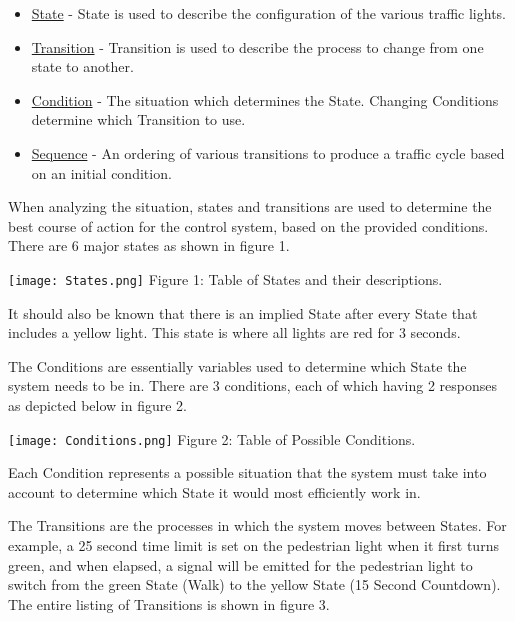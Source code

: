 \documentclass{article}
\begin{document}
\begin{itemize}

\item \underline{State} - State is used to describe the configuration of the various traffic lights.
\item \underline{Transition} - Transition is used to describe the process to change from one state to another.
\item \underline{Condition} - The situation which determines the State. Changing Conditions determine which Transition to use.
\item \underline{Sequence} - An ordering of various transitions to produce a traffic cycle based on an initial condition.

\end{itemize}

When analyzing the situation, states and transitions are used to determine the best course of action for the control system, based on the provided conditions. There are 6 major states as shown in figure 1.

\begin{center}
\texttt{[image: States.png]}
\scriptsize{
Figure 1: Table of States and their descriptions.
}
\end{center}

It should also be known that there is an implied State after every State that includes a yellow light. This state is where all lights are red for 3 seconds.

The Conditions are essentially variables used to determine which State the system needs to be in. There are 3 conditions, each of which having 2 responses as depicted below in figure 2.

\begin{center}
\texttt{[image: Conditions.png]}
\scriptsize{
Figure 2: Table of Possible Conditions.
}
\end{center}

Each Condition represents a possible situation that the system must take into account to determine which State it would most efficiently work in.

The Transitions are the processes in which the system moves between States. For example, a 25 second time limit is set on the pedestrian light when it first turns green, and when elapsed, a signal will be emitted for the pedestrian light to switch from the green State (Walk) to the yellow State (15 Second Countdown). The entire listing of Transitions is shown in figure 3.
\end{document}
